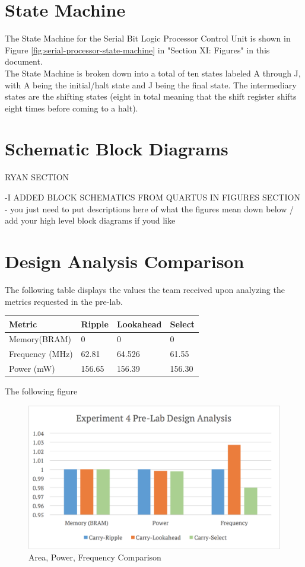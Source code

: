 \documentclass[journal, twocolumn, final,11pt,letterpaper]{IEEEtran}
\begin{document}
\section{State Machine}
The State Machine for the Serial Bit Logic Processor Control Unit is shown in Figure  \ref{fig:serial-processor-state-machine} in "Section XI: Figures" in this document. \\

The State Machine is broken down into a total of ten states labeled A through J, with A being the initial/halt state and J being the final state. The intermediary states are the shifting states (eight in total meaning that the shift register shifts eight times before coming to a halt).
	
\section{Schematic Block Diagrams}
RYAN SECTION

-I ADDED BLOCK SCHEMATICS FROM QUARTUS IN FIGURES SECTION -  you just need to put descriptions here of what the figures mean down below / add your high level block diagrams if youd like

\section{Design Analysis Comparison}
The following table displays the values the team received upon analyzing the metrics requested in the pre-lab.
\begin{center}
	\begin{tabular}{l|lll}
		Metric & Ripple & Lookahead & Select \\ \hline
		Memory(BRAM) & 0 & 0 & 0 \\
		Frequency (MHz) & 62.81 & 64.526 & 61.55\\
		Power (mW) & 156.65 & 156.39 & 156.30\\
	\end{tabular}
\end{center}

The following figure 

\begin{figure} [H]
	\centering
	\includegraphics[scale=0.35]{pre-lab-design-analysis.png}
	\caption{Area, Power, Frequency Comparison\label{fig:pre-lab-design-analysis}}
\end{figure}
\end{document}
